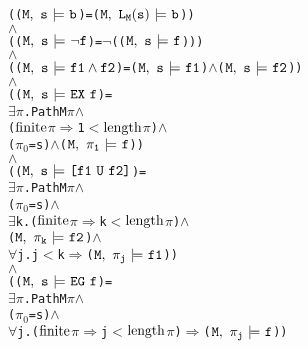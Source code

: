 \documentclass{llncs}
\newcommand{\And}{\(\wedge\)}
\newcommand{\Imp}{\(\Rightarrow\)}
\newcommand{\Not}{\(\neg\)}
\newcommand{\Forall}{\(\forall\)}
\newcommand{\Exists}{\(\exists\)}
\newcommand{\IsFinitePath}{\({\rm{finite}}\)}
\newcommand{\PathLength}{\({\rm{length}}\)}
\newcommand{\Le}{\(<\)}
\renewcommand{\Pi}{\(\pi\)}
\newcommand{\BSem}[3]{(\(\tt#1,~#2~{\models}~#3\))}
\newcommand{\OSem}[3]{(\(\tt{#1,~#2~{\models}~#3}\))}
\newcommand{\pathEl}[2]{#1_{#2}}
\newcommand{\PathEl}[2]{\(#1_{#2}\)}
\newcommand{\lNoHat}[1]{{\texttt{L}}_{#1}}
\newcommand{\oBool}[1]{#1}
\newcommand{\oNot}[1]{\neg#1}
\newcommand{\oAnd}[2]{#1\wedge#2}
\newcommand{\oEx}[1]{{\texttt{EX}}~#1}
\newcommand{\oEg}[1]{{\texttt{EG}}~#1}
\newcommand{\oEu}[2]{\texttt{[}#1~{\texttt{U}}~#2\texttt{]}}
\begin{document}
\begin{alltt}
   (\OSem{M}{s}{\oBool{b}} = {\BSem{M}{\lNoHat{M}(s)}{b}})
   {\And}
   (\OSem{M}{s}{\oNot{f}} = {\Not}(\OSem{M}{s}{f})) 
   {\And}
   (\OSem{M}{s}{\oAnd{f1}{f2}} = \OSem{M}{s}{f1} {\And} \OSem{M}{s}{f2})
   {\And}
   (\OSem{M}{s}{\oEx{f}} = 
     {\Exists}{\Pi}. Path M {\Pi}                 {\And} 
         ({\IsFinitePath} {\Pi} {\Imp} 1 {\Le} \PathLength {\Pi}) {\And} 
         (\PathEl{{\pi}}{0} = s) {\And} \OSem{M}{\pathEl{{\pi}}{1}}{f})
   {\And}
   (\OSem{M}{s}{\oEu{f1}{f2}} = 
     {\Exists}{\Pi}. Path M {\Pi}                    {\And} 
         (\PathEl{{\pi}}{0} = s)                     {\And} 
         {\Exists}k. ({\IsFinitePath} {\Pi} {\Imp} k {\Le} \PathLength {\Pi}) {\And}
             \OSem{M}{\pathEl{{\pi}}{k}}{f2}             {\And} 
             {\Forall}j. j {\Le} k {\Imp} \OSem{M}{\pathEl{{\pi}}{j}}{f1})
   {\And}
   (\OSem{M}{s}{\oEg{f}} = 
     {\Exists}{\Pi}. Path M {\Pi} {\And} 
         (\PathEl{{\pi}}{0} = s)  {\And} 
         {\Forall}j. ({\IsFinitePath} {\Pi} {\Imp} j {\Le} \PathLength {\Pi}) {\Imp} \OSem{M}{\pathEl{{\pi}}{j}}{f})
\end{alltt}
\end{document}
